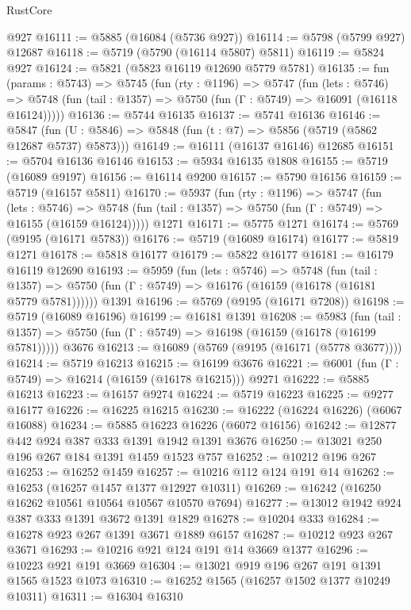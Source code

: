 \begin{lexlean}{RustCore}
\begin{coremodule}
    @927
@16111 := @5885 (@16084 (@5736 @927))
@16114 := @5798 (@5799 @927) @12687
@16118 := @5719 (@5790 (@16114 @5807) @5811)
@16119 := @5824 @927
@16124 := @5821 (@5823 @16119 @12690 @5779 @5781)
@16135 := fun (params : @5743) =>
  @5745
    (fun (rty : @1196) =>
    @5747
      (fun (lets : @5746) =>
      @5748 (fun (tail : @1357) => @5750 (fun (Γ : @5749) => @16091 (@16118 @16124)))))
@16136 := @5744 @16135
@16137 := @5741 @16136
@16146 := @5847
    (fun (U : @5846) => @5848 (fun (t : @7) => @5856 (@5719 (@5862 @12687 @5737) @5873)))
@16149 := @16111 (@16137 @16146) @12685
@16151 := @5704 @16136 @16146
@16153 := @5934 @16135 @1808
@16155 := @5719 (@16089 @9197)
@16156 := @16114 @9200
@16157 := @5790 @16156
@16159 := @5719 (@16157 @5811)
@16170 := @5937
    (fun (rty : @1196) =>
    @5747
      (fun (lets : @5746) =>
      @5748 (fun (tail : @1357) => @5750 (fun (Γ : @5749) => @16155 (@16159 @16124)))))
    @1271
@16171 := @5775 @1271
@16174 := @5769 (@9195 (@16171 @5783))
@16176 := @5719 (@16089 @16174)
@16177 := @5819 @1271
@16178 := @5818 @16177
@16179 := @5822 @16177
@16181 := @16179 @16119 @12690
@16193 := @5959
    (fun (lets : @5746) =>
    @5748
      (fun (tail : @1357) =>
      @5750 (fun (Γ : @5749) => @16176 (@16159 (@16178 (@16181 @5779 @5781))))))
    @1391
@16196 := @5769 (@9195 (@16171 @7208))
@16198 := @5719 (@16089 @16196)
@16199 := @16181 @1391
@16208 := @5983
    (fun (tail : @1357) => @5750 (fun (Γ : @5749) => @16198 (@16159 (@16178 (@16199 @5781)))))
    @3676
@16213 := @16089 (@5769 (@9195 (@16171 (@5778 @3677))))
@16214 := @5719 @16213
@16215 := @16199 @3676
@16221 := @6001 (fun (Γ : @5749) => @16214 (@16159 (@16178 @16215))) @9271
@16222 := @5885 @16213
@16223 := @16157 @9274
@16224 := @5719 @16223
@16225 := @9277 @16177
@16226 := @16225 @16215
@16230 := @16222 (@16224 @16226) (@6067 @16088)
@16234 := @5885 @16223 @16226 (@6072 @16156)
@16242 := @12877 @442 @924 @387 @333 @1391 @1942 @1391 @3676
@16250 := @13021 @250 @196 @267 @184 @1391 @1459 @1523 @757
@16252 := @10212 @196 @267
@16253 := @16252 @1459
@16257 := @10216 @112 @124 @191 @14
@16262 := @16253 (@16257 @1457 @1377 @12927 @10311)
@16269 := @16242 (@16250 @16262 @10561 @10564 @10567 @10570 @7694)
@16277 := @13012 @1942 @924 @387 @333 @1391 @3672 @1391 @1829
@16278 := @10204 @333
@16284 := @16278 @923 @267 @1391 @3671 @1889 @6157
@16287 := @10212 @923 @267 @3671
@16293 := @10216 @921 @124 @191 @14 @3669 @1377
@16296 := @10223 @921 @191 @3669
@16304 := @13021 @919 @196 @267 @191 @1391 @1565 @1523 @1073
@16310 := @16252 @1565 (@16257 @1502 @1377 @10249 @10311)
@16311 := @16304 @16310

\end{coremodule}
\end{lexlean}
